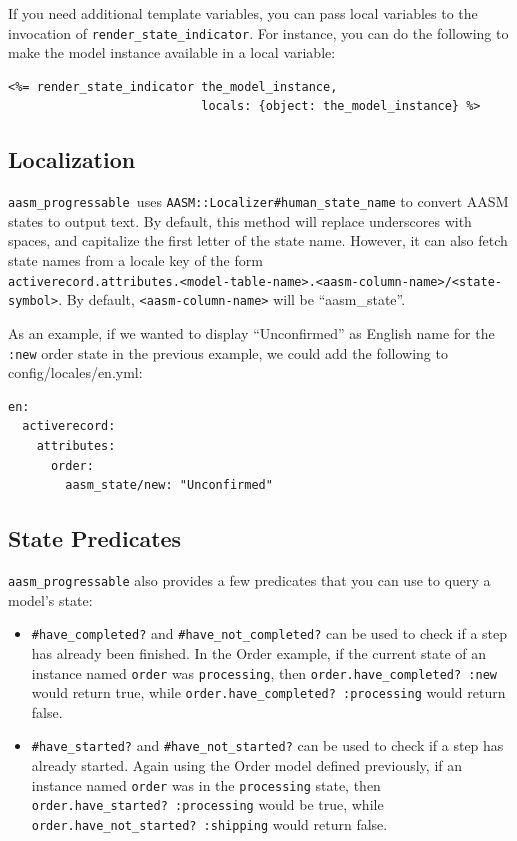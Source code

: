 \documentclass[document.tex]{subfiles}
\begin{document}
If you need additional template variables, you can pass local variables to the invocation of {\tt render\_state\_indicator}. For instance, you can do the following to make the model instance available in a local variable:

\begin{lstlisting}
<%= render_state_indicator the_model_instance,
                           locals: {object: the_model_instance} %>

\end{lstlisting}   %

\subsection{Localization}

{\tt aasm\_progressable }uses {\tt AASM::Localizer\#human\_state\_name} to convert AASM states to output text. By default, this method will replace underscores with spaces, and capitalize the first letter of the state name. However, it can also fetch state names from a locale key of the form \\ {\small \tt activerecord.attributes.\textless{}model-table-name\textgreater{}.\textless{}aasm-column-name\textgreater{}/\textless{}state-symbol\textgreater{}}. By default, {\tt \textless{}aasm-column-name\textgreater{}} will be ``aasm\_state''.

As an example, if we wanted to display ``Unconfirmed'' as English name for the {\tt :new} order state in the previous example, we could add the following to config/locales/en.yml:

\begin{lstlisting}
en:
  activerecord:
    attributes:
      order:
        aasm_state/new: "Unconfirmed"

\end{lstlisting}   %

\subsection{State Predicates}

{\tt aasm\_progressable} also provides a few predicates that you can use to query a model's state:

\begin{itemize}
\item {\tt \#have\_completed?} and {\tt \#have\_not\_completed?} can be used to check if a step has already been finished. In the Order example, if the current state of an instance named {\tt order} was {\tt processing}, then {\tt order.have\_completed? :new} would return true, while {\tt order.have\_completed? :processing} would return false.
\item {\tt \#have\_started?} and {\tt \#have\_not\_started?} can be used to check if a step has already started. Again using the Order model defined previously, if an instance named {\tt order} was in the {\tt processing} state, then {\tt order.have\_started? :processing} would be true, while {\tt order.have\_not\_started? :shipping} would return false.
\end{itemize}
\end{document}
